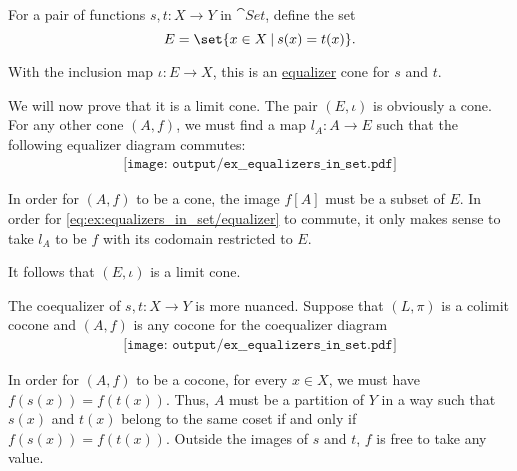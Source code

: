 \begin{example}\label{ex:equalizers_in_set}
  \hfill
  \begin{thmenum}
     For a pair of functions \( s, t: X \to Y \) in \( \cat{Set} \), define the set
    \begin{equation*}
      E = \set{ x \in X \given s(x) = t(x) }.
    \end{equation*}

    With the inclusion map \( \iota: E \to X \), this is an \hyperref[def:equalizers]{equalizer} cone for \( s \) and \( t \).

    We will now prove that it is a limit cone. The pair \( (E, \iota) \) is obviously a cone. For any other cone \( (A, f) \), we must find a map \( l_A: A \to E \) such that the following equalizer diagram commutes:
    \begin{equation}\label{eq:ex:equalizers_in_set/equalizer}
      \begin{aligned}
        \texttt{[image: output/ex\_\_equalizers\_in\_set.pdf]}
      \end{aligned}
    \end{equation}

    In order for \( (A, f) \) to be a cone, the image \( f[A] \) must be a subset of \( E \). In order for \eqref{eq:ex:equalizers_in_set/equalizer} to commute, it only makes sense to take \( l_A \) to be \( f \) with its codomain restricted to \( E \).

    It follows that \( (E, \iota) \) is a limit cone.

     The coequalizer of \( s, t: X \to Y \) is more nuanced. Suppose that \( (L, \pi) \) is a colimit cocone and \( (A, f) \) is any cocone for the coequalizer diagram
    \begin{equation}\label{eq:ex:equalizers_in_set/coequalizer}
      \begin{aligned}
        \texttt{[image: output/ex\_\_equalizers\_in\_set.pdf]}
      \end{aligned}
    \end{equation}

    In order for \( (A, f) \) to be a cocone, for every \( x \in X \), we must have \( f(s(x)) = f(t(x)) \). Thus, \( A \) must be a partition of \( Y \) in a way such that \( s(x) \) and \( t(x) \) belong to the same coset if and only if \( f(s(x)) = f(t(x)) \). Outside the images of \( s \) and \( t \), \( f \) is free to take any value.


\end{thmenum}
\end{example}

